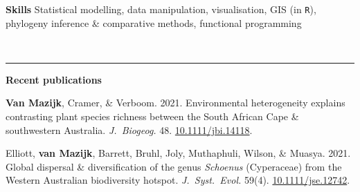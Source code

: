 \documentclass[12pt]{article}
\begin{document}
\textbf{Skills  }      \hfill Statistical modelling, data manipulation, visualisation, GIS (in \texttt{R}), \\
                       \hfill phylogeny inference \& comparative methods, functional programming

\

\hrule %

\bigskip

\textbf{Recent publications}

\vskip5pt

\textbf{Van Mazijk}, Cramer, \& Verboom. 2021.  Environmental heterogeneity explains contrasting plant species richness between the South African Cape \& southwestern Australia. \textit{J.~Biogeog.} 48. \href{https://doi.org/10.1111/jbi.14118}{10.1111/jbi.14118}.

Elliott, \textbf{van Mazijk}, Barrett, Bruhl, Joly, Muthaphuli, Wilson, \& Muasya. 2021. Global dispersal \& diversification of the genus \textit{Schoenus} (Cyperaceae) from the Western Australian biodiversity hotspot. \textit{J.~Syst.~Evol.} 59(4). \href{https://doi.org/10.1111/jse.1274}{10.1111/jse.12742}.
\end{document}
